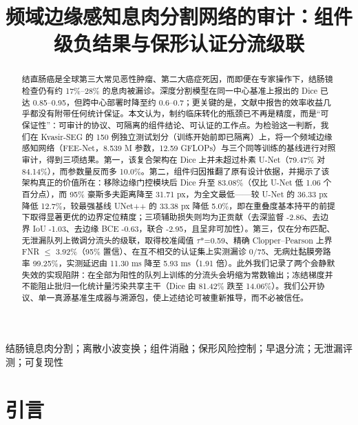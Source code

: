 \documentclass[conference]{IEEEtran}
\begin{document}
\title{频域边缘感知息肉分割网络的审计：组件级负结果与保形认证分流级联}

\author{
}

\maketitle

\begin{abstract}
\normalfont
结直肠癌是全球第三大常见恶性肿瘤、第二大癌症死因，而即便在专家操作下，结肠镜检查仍有约 17\%–28\% 的息肉被漏诊。深度分割模型在同一中心基准上报出的 Dice 已达 0.85–0.95，但跨中心部署时降至约 0.6–0.7；更关键的是，文献中报告的效率收益几乎都没有附带任何统计保证。本文认为，制约临床转化的瓶颈已不再是精度，而是“可保证性”：可审计的协议、可隔离的组件结论、可认证的工作点。为检验这一判断，我们在 Kvasir-SEG 的 150 例独立测试划分（训练开始前即已隔离）上，将一个频域边缘感知网络（FEE-Net，8.539 M 参数，12.59 GFLOPs）与三个同等训练的基线进行对照审计，得到三项结果。第一，该复合架构在 Dice 上并未超过朴素 U-Net（79.47\% 对 84.14\%），而参数量反而多 10.0\%。第二，组件归因推翻了原有设计依据，并揭示了该架构真正的价值所在：移除边缘门控模块后 Dice 升至 83.08\%（仅比 U-Net 低 1.06 个百分点），而 95\% 豪斯多夫距离降至 31.71 px，为全文最低——较 U-Net 的 36.33 px 降低 12.7\%，较最强基线 UNet++ 的 33.38 px 降低 5.0\%，即在重叠度基本持平的前提下取得显著更优的边界定位精度；三项辅助损失则均为正贡献（去深监督 -2.86、去边界 IoU -1.03、去边缘 BCE -0.63，联合 -2.95，且呈非可加性）。第三，仅在分布匹配、无泄漏队列上微调分流头的级联，取得校准阈值 $\tau$*=0.59、精确 Clopper–Pearson 上界 FNR $\le$ 3.92\%（95\% 置信）、在互不相交的认证集上实测漏诊 0/75、无病灶黏膜旁路率 99.25\%，实测延迟由 11.30 ms 降至 5.93 ms（1.91 倍）。此外我们记录了两个会静默失效的实现陷阱：在全部为阳性的队列上训练的分流头会坍缩为常数输出；冻结梯度并不能阻止批归一化统计量污染共享主干（Dice 由 81.42\% 跌至 14.06\%）。我们公开协议、单一真源基准生成器与溯源包，使上述结论可被重新推导，而不必被信任。
\end{abstract}

\begin{IEEEkeywords}
结肠镜息肉分割；离散小波变换；组件消融；保形风险控制；早退分流；无泄漏评测；可复现性
\end{IEEEkeywords}

\section{引言}
\end{document}
